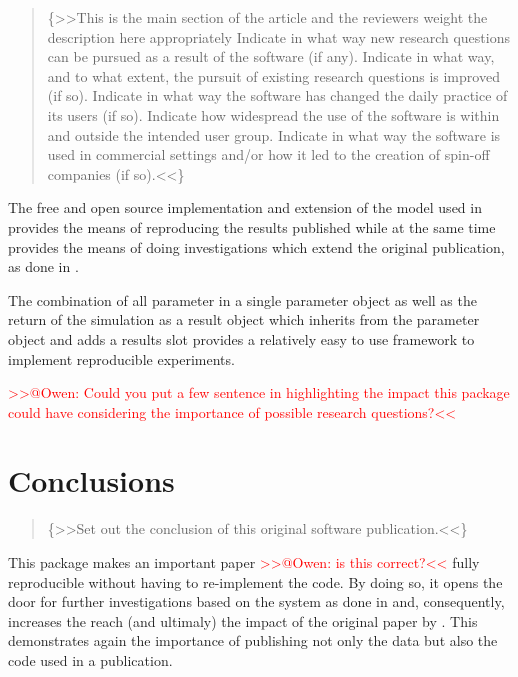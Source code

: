 \documentclass[]{elsarticle} %
\begin{document}
\begin{quote}
\{\textgreater\textgreater This is the main section of the article and
the reviewers weight the description here appropriately Indicate in what
way new research questions can be pursued as a result of the software
(if any). Indicate in what way, and to what extent, the pursuit of
existing research questions is improved (if so). Indicate in what way
the software has changed the daily practice of its users (if so).
Indicate how widespread the use of the software is within and outside
the intended user group. Indicate in what way the software is used in
commercial settings and/or how it led to the creation of spin-off
companies (if so).\textless\textless\}
\end{quote}

The free and open source implementation and extension of the model used
in \citet{Bush2017} provides the means of reproducing the results
published while at the same time provides the means of doing
investigations which extend the original publication, as done in
\citet{REF_NEEDED}.

The combination of all parameter in a single parameter object as well as
the return of the simulation as a result object which inherits from the
parameter object and adds a results slot provides a relatively easy to
use framework to implement reproducible experiments.

\textcolor{red}{{>>@Owen: Could you put a few sentence in highlighting the impact this package could have considering the importance of possible research questions?<<}}

\hypertarget{conclusions}{%
\section{Conclusions}\label{conclusions}}

\begin{quote}
\{\textgreater\textgreater Set out the conclusion of this original
software publication.\textless\textless\}
\end{quote}

This package makes an important paper
\textcolor{red}{{>>@Owen: is this correct?<<}} \citep{Bush2017} fully
reproducible without having to re-implement the code. By doing so, it
opens the door for further investigations based on the system as done in
\citet{REF_NEEDED} and, consequently, increases the reach (and ultimaly)
the impact of the original paper by \citet{Bush2017}. This demonstrates
again \citep{REF_NEEDED} the importance of publishing not only the data
but also the code used in a publication.
\end{document}
